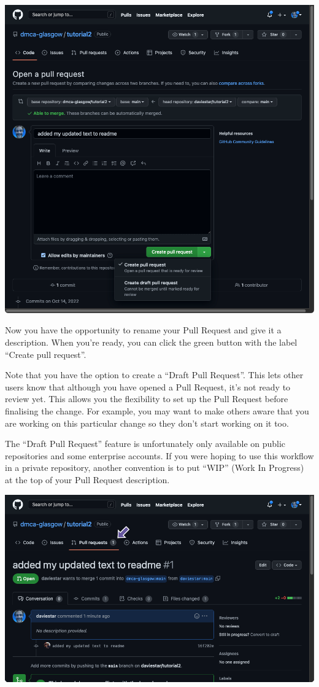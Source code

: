 \documentclass[
  letterpaper,
  DIV=11,
  numbers=noendperiod]{scrartcl}
\begin{document}
\includegraphics{images/image85.png}

Now you have the opportunity to rename your Pull Request and give it a
description. When you're ready, you can click the green button with the
label ``Create pull request''.

Note that you have the option to create a ``Draft Pull Request''. This
lets other users know that although you have opened a Pull Request, it's
not ready to review yet. This allows you the flexibility to set up the
Pull Request before finalising the change. For example, you may want to
make others aware that you are working on this particular change so they
don't start working on it too.

The ``Draft Pull Request'' feature is unfortunately only available on
public repositories and some enterprise accounts. If you were hoping to
use this workflow in a private repository, another convention is to put
``WIP'' (Work In Progress) at the top of your Pull Request description.

\includegraphics{images/image86.png}
\end{document}
